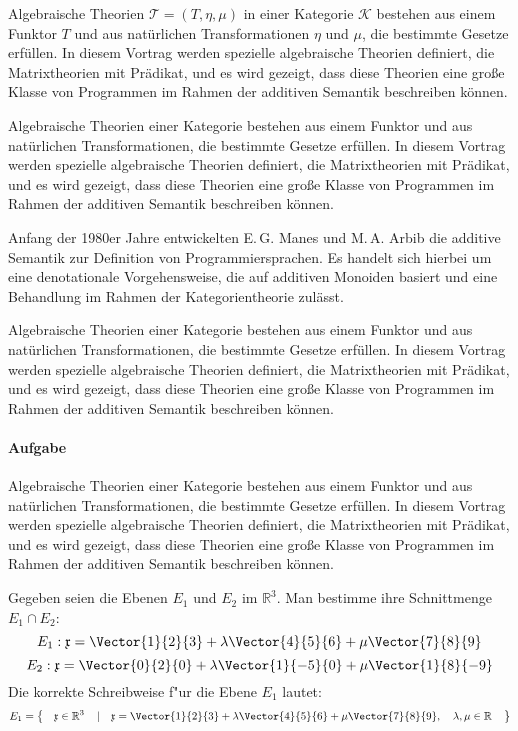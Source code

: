 Algebraische Theorien $\mathcal{T}=(T,\eta,\mu)$ in einer Kategorie
$\mathcal{K}$ bestehen aus einem Funktor $T$ und aus natürlichen
Transformationen $\eta$ und $\mu$, die bestimmte Gesetze erfüllen. In
diesem Vortrag werden spezielle algebraische Theorien definiert, die
Matrixtheorien mit Prädikat, und es wird gezeigt, dass diese Theorien
eine große Klasse von Programmen im Rahmen der additiven Semantik
beschreiben können.\algtheorie

Algebraische Theorien einer Kategorie bestehen aus einem Funktor und
aus natürlichen Transformationen, die bestimmte Gesetze erfüllen. In
diesem Vortrag werden spezielle algebraische Theorien definiert, die
Matrixtheorien mit Prädikat, und es wird gezeigt, dass diese Theorien
eine große Klasse von Programmen im Rahmen der additiven Semantik
beschreiben können.

Anfang der 1980er Jahre entwickelten E.\,G. Manes und M.\,A. Arbib die
additive Semantik zur Definition von Programmiersprachen. Es handelt
sich hierbei um eine denotationale Vorgehensweise, die auf additiven
Monoiden basiert und eine Behandlung im Rahmen der Kategorientheorie
zulässt.

Algebraische Theorien einer Kategorie bestehen aus einem Funktor und
aus natürlichen Transformationen, die bestimmte Gesetze erfüllen. In
diesem Vortrag werden spezielle algebraische Theorien definiert, die
Matrixtheorien mit Prädikat, und es wird gezeigt, dass diese Theorien
eine große Klasse von Programmen im Rahmen der additiven Semantik
beschreiben können.

\paragraph{Aufgabe}

Algebraische Theorien einer Kategorie bestehen aus einem Funktor und
aus natürlichen Transformationen, die bestimmte Gesetze erfüllen. In
diesem Vortrag werden spezielle algebraische Theorien definiert, die
Matrixtheorien mit Prädikat, und es wird gezeigt, dass diese Theorien
eine große Klasse von Programmen im Rahmen der additiven Semantik
beschreiben können.

Gegeben seien die Ebenen $E_1$ und $E_2$
im $\mathbb{R}^3$. Man bestimme ihre Schnittmenge $E_1\cap E_2$:
$$E_1:\mathfrak{x}=
\Vector{1}{2}{3}+\lambda\Vector{4}{5}{6}+\mu\Vector{7}{8}{9}$$
$$E_2:\mathfrak{x}=
\Vector{0}{2}{0}+\lambda\Vector{1}{-5}{0}+\mu\Vector{1}{8}{-9}$$
Die korrekte Schreibweise f"ur die Ebene $E_1$ lautet:
$$E_1=\left\{\quad\mathfrak{x}\in\mathbb{R}^3\quad\left|\quad\mathfrak{x}=
\Vector{1}{2}{3}+\lambda\Vector{4}{5}{6}+\mu\Vector{7}{8}{9},\quad
\lambda,\mu\in\mathbb{R}\quad\right.\right\}$$

